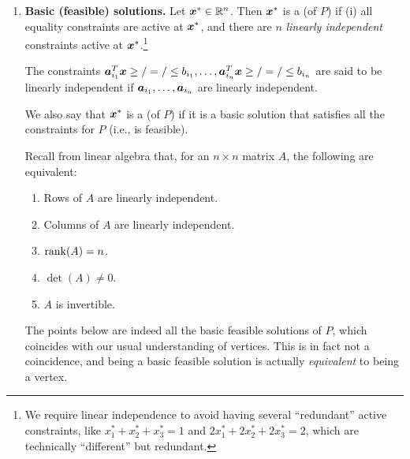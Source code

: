 \begin{enumerate}
\item\label{it:bfs} \textbf{Basic (feasible) solutions.} Let \(\bm{x}^*\in\mathbb{R}^n\). Then
\(\bm{x}^*\) is a  (of \(P\)) if (i) all equality
constraints are active at \(\bm{x}^*\), and there are \(n\) \emph{linearly
independent} constraints active at \(\bm{x}^*\).\footnote{We require linear
independence to avoid having several ``redundant'' active constraints, like
\(x_1^*+x_2^*+x_3^*=1\) and \(2x_1^*+2x_2^*+2x_3^*=2\), which are technically
``different'' but redundant.}
\begin{note}
The constraints
\(\bm{a}_{i_1}^{T}\bm{x}\ge/=/\le b_{i_1},\dotsc,\bm{a}_{i_n}^{T}\bm{x}\ge/=/\le b_{i_n}\)
are said to be linearly independent if \(\bm{a}_{i_1},\dotsc,\bm{a}_{i_n}\)
are linearly independent.
\end{note}

We also say that \(\bm{x}^*\) is a  (of \(P\))
if it is a basic solution that satisfies all the constraints for \(P\) (i.e.,
is feasible).

\begin{note}
Recall from linear algebra that, for an \(n\times n\) matrix \(A\), the
following are equivalent:
\begin{enumerate}
\item Rows of \(A\) are linearly independent.
\item Columns of \(A\) are linearly independent.
\item \(\operatorname{rank}(A)=n\).
\item \(\det(A)\ne 0\).
\item \(A\) is invertible.
\end{enumerate}
\end{note}

The  points below are indeed all the basic feasible solutions of \(P\),
which coincides with our usual understanding of vertices. This is in fact not a
coincidence, and being a basic feasible solution is actually \emph{equivalent}
to being a vertex.
\begin{center}
\end{center}


\end{enumerate}
